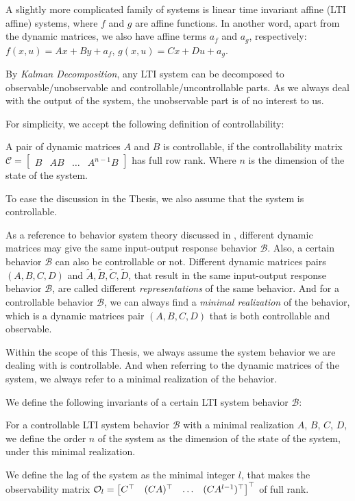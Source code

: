 A slightly more complicated family of systems is linear time invariant affine (LTI affine) systems, where $f$ and $g$ are affine functions.
In another word, apart from the dynamic matrices, we also have affine terms $a_f$ and $a_g$, respectively:
$f\left(x,u\right) = A x + B y + a_f$, $g\left(x, u\right) = C x + D u + a_g$.

By \emph{Kalman Decomposition}, any LTI system can be decomposed to observable/unobservable and controllable/uncontrollable parts.
As we always deal with the output of the system, the unobservable part is of no interest to us.

For simplicity, we accept the following definition of controllability:

\begin{definition}\label{def:lti-controllability}
    A pair of dynamic matrices $A$ and $B$ is controllable, if the controllability matrix $\mathcal{C} = \begin{bmatrix} B & A B & \ldots & A^{n-1} B \end{bmatrix}$ has full row rank.
    Where $n$ is the dimension of the state of the system.
\end{definition}

To ease the discussion in the Thesis, we also assume that the system is controllable.

As a reference to behavior system theory discussed in \cite{markovskyBehavioralSystemsTheory2021}, different dynamic matrices may give the same input-output response behavior $\mathscr{B}$.
Also, a certain behavior $\mathscr{B}$ can also be controllable or not.
Different dynamic matrices pairs $(A, B, C, D)$ and $\tilde{A}, \tilde{B}, \tilde{C}, \tilde{D}$, that result in the same input-output response behavior $\mathscr{B}$, are called different \emph{representations} of the same behavior.
And for a controllable behavior $\mathscr{B}$, we can always find a \emph{minimal realization} of the behavior, which is a dynamic matrices pair $(A, B, C, D)$ that is both controllable and observable.

Within the scope of this Thesis, we always assume the system behavior we are dealing with is controllable.
And when referring to the dynamic matrices of the system, we always refer to a minimal realization of the behavior.

We define the following invariants of a certain LTI system behavior $\mathscr{B}$:

\begin{definition}\label{def:order-lag}
    For a controllable LTI system behavior $\mathscr{B}$ with a minimal realization $A$, $B$, $C$, $D$, we define the order $n$ of the system as the dimension of the state of the system, under this minimal realization.

    We define the lag of the system as the minimal integer $l$, that makes the observability matrix $\mathcal{O}_l = \begin{bmatrix} C^{\top} & (C A)^{\top} & \ldots & (C A^{l-1})^{\top} \end{bmatrix}^{\top}$ of full rank.
\end{definition}

